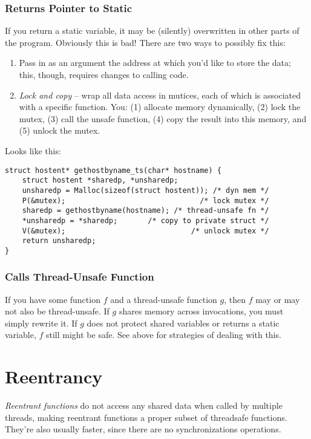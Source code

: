 \documentclass[fleqn]{article}
\begin{document}
\subsubsection{Returns Pointer to Static}

If you return a static variable, it may be (silently) overwritten in other parts of the program. Obviously this is bad! There are two ways to possibly fix this:

\begin{enumerate}
\item Pass in as an argument the address at which you'd like to store the data; this, though, requires changes to calling code.

\item \textit{Lock and copy} -- wrap all data access in mutices, each of which is associated with a specific function. You: (1) allocate memory dynamically, (2) lock the mutex, (3) call the unsafe function, (4) copy the result into this memory, and (5) unlock the mutex.
\end{enumerate}

Looks like this:

\begin{verbatim}
struct hostent* gethostbyname_ts(char* hostname) {
    struct hostent *sharedp, *unsharedp;
    unsharedp = Malloc(sizeof(struct hostent)); /* dyn mem */
    P(&mutex);                               /* lock mutex */
    sharedp = gethostbyname(hostname); /* thread-unsafe fn */
    *unsharedp = *sharedp;       /* copy to private struct */
    V(&mutex);                             /* unlock mutex */
    return unsharedp;
}
\end{verbatim}

\subsubsection{Calls Thread-Unsafe Function}

If you have some function $f$ and a thread-unsafe function $g$, then $f$ may or may not also be thread-unsafe. If $g$ shares memory across invocations, you must simply rewrite it. If $g$ does not protect shared variables or returns a static variable, $f$ still might be safe. See above for strategies of dealing with this.

\section{Reentrancy}

\textit{Reentrant functions} do not access any shared data when called by multiple threads, making reentrant functions a proper subset of threadsafe functions. They're also usually faster, since there are no synchronizations operations.
\end{document}
